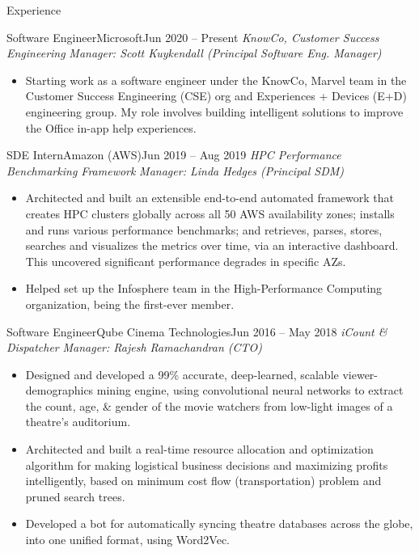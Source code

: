 \documentclass[]{mcdowellcv}
\begin{document}
	\makeheader


	\begin{cvsection}{Experience}
	        \begin{cvsubsection}{Software Engineer}{Microsoft}{Jun 2020 – Present}
			\textit{KnowCo, Customer Success Engineering} \hfill \textit{Manager:  Scott Kuykendall (Principal Software Eng. Manager)}
			\begin{itemize}
            \item Starting work as a software engineer under the KnowCo, Marvel team in the Customer Success Engineering (CSE) org and Experiences + Devices (E+D) engineering group. My role involves building intelligent solutions to improve the Office in-app help experiences.
			\end{itemize}
		\end{cvsubsection}
	        \begin{cvsubsection}{SDE Intern}{Amazon (AWS)}{Jun 2019 – Aug 2019}
			\textit{HPC Performance Benchmarking Framework} \hfill \textit{Manager: Linda Hedges (Principal SDM)}
			\begin{itemize}
            \item Architected and built an extensible end-to-end automated framework that creates HPC clusters globally across all 50 AWS availability zones; installs and runs various performance benchmarks; and retrieves, parses, stores, searches and visualizes the metrics over time, via an interactive dashboard. This uncovered significant performance degrades in specific AZs. %
            \item Helped set up the Infosphere team in the High-Performance Computing organization, being the first-ever member.
			\end{itemize}
		\end{cvsubsection}

		\begin{cvsubsection}{Software Engineer}{Qube Cinema Technologies}{Jun 2016 – May 2018}
			\textit{iCount \& Dispatcher} \hfill \textit{Manager: Rajesh Ramachandran (CTO)}
			\begin{itemize}
            \item Designed and developed a 99\% accurate, deep-learned, scalable viewer-demographics mining engine, using convolutional neural networks to extract the count, age, \& gender of the movie watchers from low-light images of a theatre's auditorium. %
            \item Architected and built a real-time resource allocation and optimization algorithm for making logistical business decisions and maximizing profits intelligently, based on minimum cost flow (transportation) problem and pruned search trees.
            \item Developed a bot for automatically syncing theatre databases across the globe, into one unified format, using Word2Vec.
			\end{itemize}
		\end{cvsubsection}


\end{cvsection}
\end{document}
